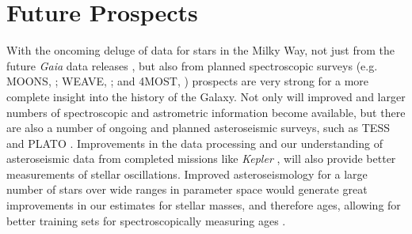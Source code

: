 \section{Future Prospects}

With the oncoming deluge of data for stars in the Milky Way, not just from the future \emph{Gaia} data releases \citep[which will include epoch spectroscopy and photometry, offering the potential to mine the data for element abundances and ages, e.g.][]{2016A&A...595A...1G}, but also from planned spectroscopic surveys (e.g. MOONS, \citeauthor{2012SPIE.8446E..0SC} \citeyear{2012SPIE.8446E..0SC}; WEAVE, \citeauthor{2012SPIE.8446E..0PD} \citeyear{2012SPIE.8446E..0PD}; and 4MOST, \citeauthor{2016SPIE.9908E..1OD} \citeyear{2016SPIE.9908E..1OD}) prospects are very strong for a more complete insight into the history of the Galaxy. Not only will improved and larger numbers of spectroscopic and astrometric information become available, but there are also a number of ongoing and planned asteroseismic surveys, such as TESS \citep{2015JATIS...1a4003R} and PLATO \citep{2017AN....338..644M}. Improvements in the data processing and our understanding of asteroseismic data from completed missions like \emph{Kepler} \citep{2010Sci...327..977B}, will also provide better measurements of stellar oscillations. Improved asteroseismology for a large number of stars over wide ranges in parameter space would generate great improvements in our estimates for stellar masses, and therefore ages, allowing for better training sets for spectroscopically measuring ages \citep[Such as those in Chapter \ref{chapter:apogeestruc}, from methods like that of e.g.][]{2016MNRAS.456.3655M}. 